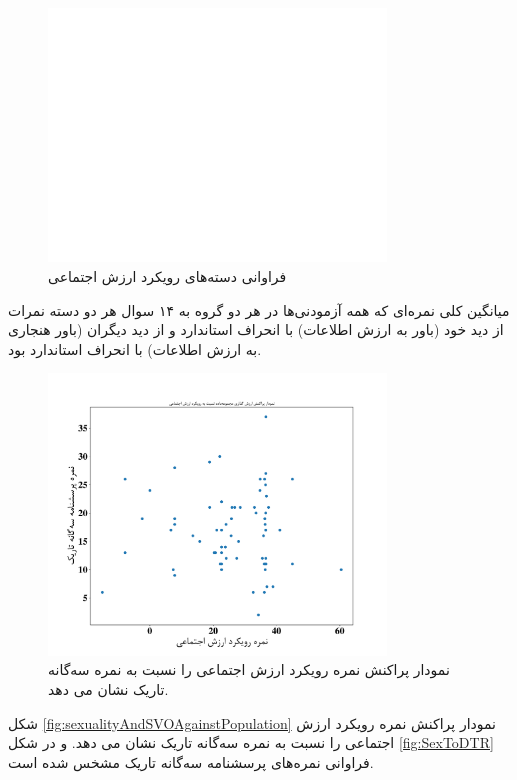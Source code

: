 \begin{figure}[htpb]
    \centering
    \includegraphics[width=0.8\textwidth]{./img/SVOAgainstPopulation.pdf}
    \caption{فراوانی دسته‌های رویکرد ارزش اجتماعی}
    \label{fig:SVOAgainstPopulation}
\end{figure}
میانگین کلی نمره‌ای که همه آزمودنی‌ها در هر دو گروه به ۱۴ سوال هر دو دسته
نمرات از دید خود
\!(باور به ارزش اطلاعات)
\meanOfSelfWTPAllTwoParticipantGroupsAllTwoQuestionSection
با انحراف استاندارد
\SDOfSelfWTPAllTwoParticipantGroupsAllTwoQuestionSection
و از دید دیگران
\meanOfOtherWTPAllTwoParticipantGroupsAllTwoQuestionSection
\!(باور هنجاری به ارزش اطلاعات)
با انحراف استاندارد
\SDOfOtherWTPAllTwoParticipantGroupsAllTwoQuestionSection
بود.

\begin{figure}[htpb]
    \centering
    \includegraphics[width=0.8\textwidth]{./img/ScatterSVOScoreDarkTriadScore.pdf}
    \caption{نمودار پراکنش نمره رویکرد ارزش اجتماعی را نسبت به نمره سه‌گانه تاریک نشان می دهد. }
    \label{fig:ScatterSVOScoreDarkTriadScore}
\end{figure}
شکل
\ref{fig:sexualityAndSVOAgainstPopulation}
نمودار پراکنش نمره رویکرد ارزش اجتماعی را نسبت به نمره سه‌گانه تاریک نشان می دهد.
و در شکل
\ref{fig:SexToDTR}
فراوانی نمره‌های پرسشنامه سه‌گانه تاریک مشخس شده است.



